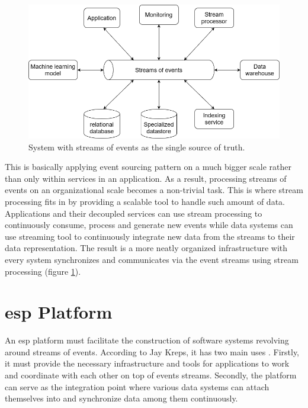 \begin{figure}[h]
	\centering
	\includegraphics[width=12.9cm]{images/eventstreamprocessing.png}
	\caption{System with streams of events as the single source of truth.}
	\label{fig:eventstreamprocessingsystem}
\end{figure}

This is basically applying event sourcing pattern on a much bigger scale rather than only within services in an application. As a result, processing streams of events on an organizational scale becomes a non-trivial task. This is where stream processing fits in by providing a scalable tool to handle such amount of data. Applications and their decoupled services can use stream processing to continuously consume, process and generate new events while data systems can use streaming tool to continuously integrate new data from the streams to their data representation. The result is a more neatly organized infrastructure with every system synchronizes and communicates via the event streams using stream processing (figure \ref{fig:eventstreamprocessingsystem}). 




\section{\acrlong{esp} Platform} \label{section:general-ESP-platform}
An \acrshort{esp} platform must facilitate the construction of software systems revolving around streams of events. According to Jay Kreps, it has two main uses \cite{eventstreamingplatform}. Firstly, it must provide the necessary infrastructure and tools for applications to work and coordinate with each other on top of events streams. Secondly, the platform can serve as the integration point where various data systems can attach themselves into and synchronize data among them continuously.

